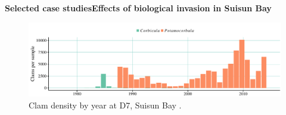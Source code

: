\documentclass[serif]{beamer}\usepackage[]{graphicx}\usepackage[]{color}
\begin{document}
\begin{frame}{\textbf{Selected case studies}}{\textbf{Effects of biological invasion in Suisun Bay}}
\vspace{-0.1in}
\begin{figure}
\centerline{\includegraphics[width = \textwidth]{fig/d7clam.pdf}}
\caption{Clam density by year at D7, Suisun Bay \cite{Crauder16}.}
\end{figure}
\vspace{-0.1in}
\begin{columns}
\begin{column}{0.35\textwidth}
\end{column}
\begin{column}{0.35\textwidth}
\end{column}
\end{columns}
\end{frame}
\end{document}
